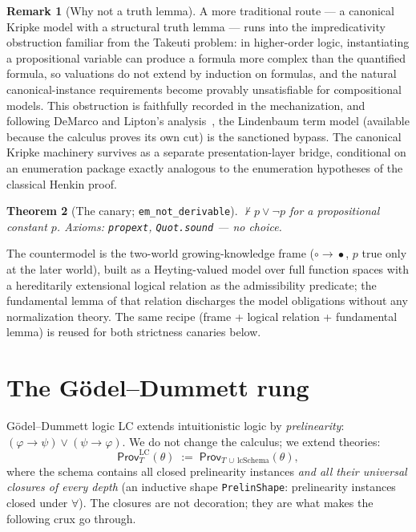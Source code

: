 \documentclass[11pt]{article}
\newcommand{\code}[1]{\texttt{#1}}
\newcommand{\Prov}{\mathsf{Prov}}
\newcommand{\ProvLC}{\mathsf{Prov}^{\mathrm{LC}}}
\theoremstyle{plain}
\newtheorem{theorem}{Theorem}[section]
\theoremstyle{definition}
\newtheorem{remark}[theorem]{Remark}
\begin{document}
\begin{remark}[Why not a truth lemma]
A more traditional route --- a canonical Kripke model with a structural truth
lemma --- runs into the impredicativity obstruction familiar from the Takeuti
problem: in higher-order logic, instantiating a propositional variable can
produce a formula more complex than the quantified formula, so valuations do
not extend by induction on formulas, and the natural canonical-instance
requirements become provably unsatisfiable for compositional models.  This
obstruction is faithfully recorded in the mechanization, and following
DeMarco and Lipton's analysis~\cite{demarco-lipton}, the Lindenbaum term
model (available because the calculus proves its own cut) is the sanctioned
bypass.  The canonical Kripke machinery survives as a separate
presentation-layer bridge, conditional on an enumeration package exactly
analogous to the enumeration hypotheses of the classical Henkin proof.
\end{remark}

\begin{theorem}[The canary; \code{em\_not\_derivable}]
$\not\vdash p\vee\neg p$ for a propositional constant $p$.
Axioms: \code{propext}, \code{Quot.sound} --- no choice.
\end{theorem}

The countermodel is the two-world growing-knowledge frame
($\circ\!\to\!\bullet$, $p$ true only at the later world), built as a
Heyting-valued model over full function spaces with a hereditarily
extensional logical relation as the admissibility predicate; the fundamental
lemma of that relation discharges the model obligations without any
normalization theory.  The same recipe (frame + logical relation +
fundamental lemma) is reused for both strictness canaries below.

\section{The G\"odel--Dummett rung}\label{sec:lc}

G\"odel--Dummett logic LC extends intuitionistic logic by
\emph{prelinearity}: $(\varphi\to\psi)\vee(\psi\to\varphi)$.  We do not
change the calculus; we extend theories:
\[
  \ProvLC_T(\theta) \;:=\; \Prov_{T\,\cup\,\mathrm{lcSchema}}(\theta),
\]
where the schema contains all closed prelinearity instances \emph{and all
their universal closures of every depth} (an inductive shape
\code{PrelinShape}: prelinearity instances closed under $\forall$).  The
closures are not decoration; they are what makes the following crux go
through.
\end{document}
